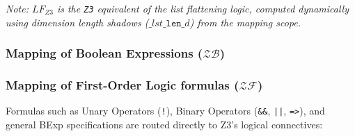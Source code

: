 \documentclass{article}
\begin{document}
\textit{Note: $\mathit{LF_{Z3}}$ is the \texttt{Z3} equivalent of the list flattening logic, computed dynamically using dimension length shadows ($\texttt{\_}lst\texttt{\_len\_}d$) from the mapping scope.}

\newpage
\subsubsection{Mapping of Boolean Expressions ($\mathcal{ZB}$)}

\begin{table}[h!]
\centering
\renewcommand{\arraystretch}{1.8} 
\end{table}

\subsubsection{Mapping of First-Order Logic formulas ($\mathcal{ZF}$)}

Formulas such as Unary Operators (\texttt{!}), Binary Operators (\texttt{\&\&}, \texttt{||}, \texttt{=>}), and general BExp specifications are routed directly to Z3's logical connectives:
\end{document}
